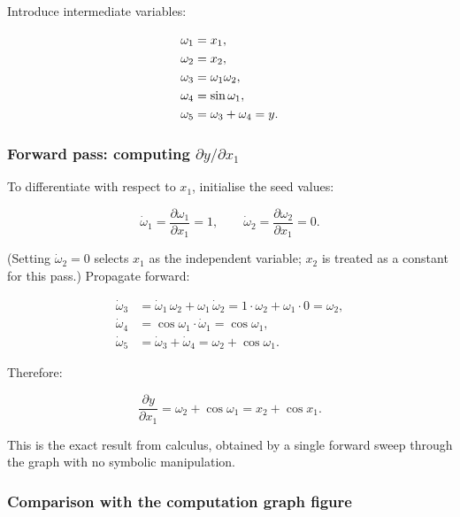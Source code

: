 \documentclass[12pt, a4paper]{article}
\begin{document}
Introduce intermediate variables:

\begin{align}
  \omega_1 &= x_1, \notag\\
  \omega_2 &= x_2, \notag\\
  \omega_3 &= \omega_1 \omega_2, \notag\\
  \omega_4 &= \sin \omega_1, \notag\\
  \omega_5 &= \omega_3 + \omega_4 = y. \notag
\end{align}

\subsubsection*{Forward pass: computing $\partial y / \partial x_1$}

To differentiate with respect to $x_1$, initialise the seed values:

\begin{equation}
  \dot{\omega}_1 = \frac{\partial \omega_1}{\partial x_1} = 1, \qquad
  \dot{\omega}_2 = \frac{\partial \omega_2}{\partial x_1} = 0.
\end{equation}

(Setting $\dot{\omega}_2 = 0$ selects $x_1$ as the independent variable;
$x_2$ is treated as a constant for this pass.)
Propagate forward:

\begin{align}
  \dot{\omega}_3
    &= \dot{\omega}_1 \,\omega_2 + \omega_1 \,\dot{\omega}_2
     = 1 \cdot \omega_2 + \omega_1 \cdot 0
     = \omega_2, \\[4pt]
  \dot{\omega}_4
    &= \cos \omega_1 \cdot \dot{\omega}_1
     = \cos \omega_1, \\[4pt]
  \dot{\omega}_5
    &= \dot{\omega}_3 + \dot{\omega}_4
     = \omega_2 + \cos \omega_1.
\end{align}

Therefore:

\begin{equation}
  \frac{\partial y}{\partial x_1} = \omega_2 + \cos \omega_1
  = x_2 + \cos x_1.
\end{equation}

This is the exact result from calculus, obtained by a single forward sweep
through the graph with no symbolic manipulation.

\subsubsection*{Comparison with the computation graph figure}
\end{document}
